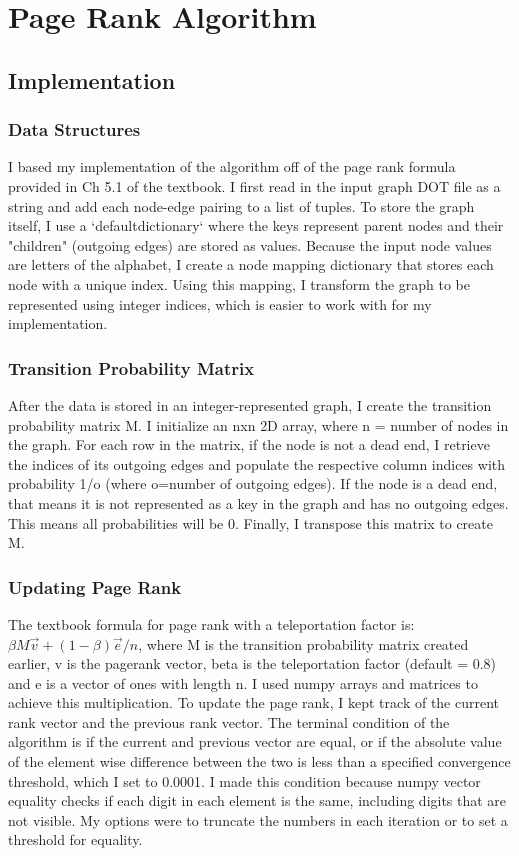\documentclass{article}
\begin{document}
\section{Page Rank Algorithm}
\subsection{Implementation}
\subsubsection{Data Structures}
I based my implementation of the algorithm off of the page rank formula provided in Ch 5.1 of the textbook. I first read in the input graph DOT file as a string and add each node-edge pairing to a list of tuples. To store the graph itself, I use a `defaultdictionary` where the keys represent parent nodes and their "children" (outgoing edges) are stored as values. Because the input node values are letters of the alphabet, I create a node mapping dictionary that stores each node with a unique index. Using this mapping, I transform the graph to be represented using integer indices, which is easier to work with for my implementation. 
\subsubsection{Transition Probability Matrix}
After the data is stored in an integer-represented graph, I create the transition probability matrix M. I initialize an nxn 2D array, where n = number of nodes in the graph. For each row in the matrix, if the node is not a dead end, I retrieve the indices of its outgoing edges and populate the respective column indices with probability 1/o (where o=number of outgoing edges). If the node is a dead end, that means it is not represented as a key in the graph and has no outgoing edges. This means all probabilities will be 0. Finally, I transpose this matrix to create M. 
\subsubsection{Updating Page Rank}
The textbook formula for page rank with a teleportation factor is: $\beta M \vec{v} + (1-\beta)\vec{e}/n$, where M is the transition probability matrix created earlier, v is the pagerank vector, beta is the teleportation factor (default = 0.8) and e is a vector of ones with length n. I used numpy arrays and matrices to achieve this multiplication. To update the page rank, I kept track of the current rank vector and the previous rank vector. 
The terminal condition of the algorithm is if the current and previous vector are equal, or if the absolute value of the element wise difference between the two is less than a specified convergence threshold, which I set to 0.0001. I made this condition because numpy vector equality checks if each digit in each element is the same, including digits that are not visible. My options were to truncate the numbers in each iteration or to set a threshold for equality. 
\end{document}
